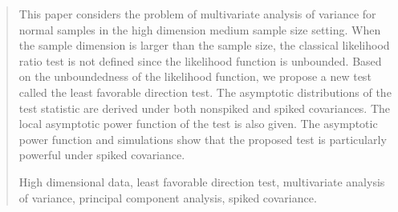 \documentclass[12pt]{article} %
\renewcommand{\theequation}{\thesection\arabic{equation}}
\theoremstyle{definition}
\begin{document}
\begin{quotation}
This paper considers the problem of multivariate analysis of variance for normal samples in the high dimension medium sample size setting.
    When the sample dimension is larger than the sample size, the classical likelihood ratio test is not defined since the likelihood function is unbounded.
    Based on the unboundedness of the likelihood function, we propose a new test called the least favorable direction test.
    The asymptotic distributions of the test statistic are derived under both nonspiked and spiked covariances.
    The local asymptotic power function of the test is also given.
    The asymptotic power function and simulations show that the proposed test is particularly powerful under spiked covariance.

\vspace{9pt}
    High dimensional data, least favorable direction test, multivariate analysis of variance, principal component analysis, spiked covariance.
\par
\end{quotation}\par



\def\thefigure{\arabic{figure}}
\def\thetable{\arabic{table}}

\renewcommand{\theequation}{\thesection.\arabic{equation}}


\fontsize{12}{14pt plus.8pt minus .6pt}\selectfont

\setcounter{section}{1} %
\setcounter{equation}{0} %
\end{document}
